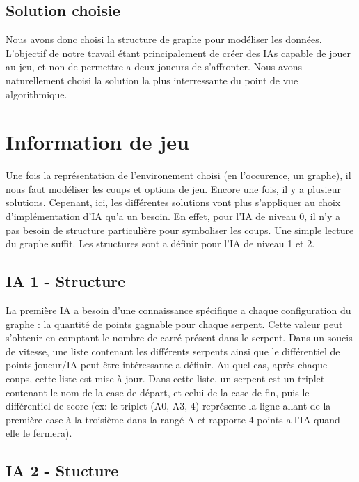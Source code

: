 \documentclass[a4paper,12pt]{report}
\begin{document}
\section{Solution choisie}

Nous avons donc choisi la structure de graphe pour mod\'eliser les donn\'ees. L'objectif de notre travail \'etant principalement de cr\'eer des IAs capable de jouer au jeu, et non de permettre a deux joueurs de s'affronter. Nous avons naturellement choisi la solution la plus interressante du point de vue algorithmique. 

\chapter{Information de jeu}

Une fois la repr\'esentation de l'environement choisi (en l'occurence, un graphe), il nous faut mod\'eliser les coups et options de jeu. Encore une fois, il y a plusieur solutions. Cepenant, ici, les diff\'erentes solutions vont plus s'appliquer au choix d'impl\'ementation d'IA qu'a un besoin. En effet, pour l'IA de niveau 0, il n'y a pas besoin de structure particuli\`ere pour symboliser les coups. Une simple lecture du graphe suffit. Les structures sont a d\'efinir pour l'IA de niveau 1 et 2. 

\section{IA 1 - Structure}

La premi\`ere IA a besoin d'une connaissance sp\'ecifique a chaque configuration du graphe : la quantit\'e de points gagnable pour chaque serpent. Cette valeur peut s'obtenir en comptant le nombre de carr\'e pr\'esent dans le serpent. Dans un soucis de vitesse, une liste contenant les diff\'erents serpents ainsi que le diff\'erentiel de points joueur/IA peut \^etre int\'eressante a d\'efinir. Au quel cas, apr\`es chaque coups, cette liste est mise \`a jour. Dans cette liste, un serpent est un triplet contenant le nom de la case de d\'epart, et celui de la case de fin, puis le diff\'erentiel de score (ex: le triplet (A0, A3, 4) repr\'esente la ligne allant de la premi\`ere case \`a la troisi\`eme dans la rang\'e A et rapporte 4 points a l'IA quand elle le fermera).

\section{IA 2 - Stucture}
\end{document}
